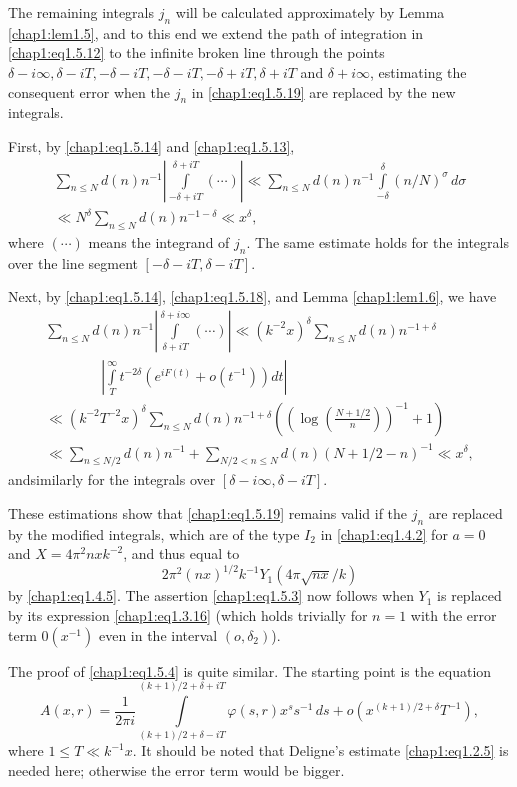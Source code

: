 The remaining integrals $j_n$ will be calculated approximately by
Lem\-ma \ref{chap1:lem1.5}, and to this end we extend the path of
integration in \eqref{chap1:eq1.5.12} to the infinite broken line
through the points $\delta-i\infty, \delta-iT, -\delta-iT, -\delta-iT,
-\delta+iT, \delta+iT$ and $\delta+i\infty$, estimating the consequent
error when the $j_n$ in \eqref{chap1:eq1.5.19} are replaced by the new
integrals. 

First, by \eqref{chap1:eq1.5.14} and \eqref{chap1:eq1.5.13},
\begin{gather*}
\sum\limits_{n\leq N}d(n)n^{-1}\left|\int\limits_{-\delta+iT}
^{\delta+iT}(\cdots)\right|\ll \sum\limits_{n\leq N}d(n)n^{-1}
\int\limits_{-\delta}^\delta(n/N)^\sigma \,d\sigma\\
\ll N^\delta \sum\limits_{n\leq N}d(n)n^{-1-\delta}\ll x^\delta,
\end{gather*}
where $(\cdots)$ means the integrand of $j_n$. The same estimate holds
for the integrals over the line segment $[-\delta-iT, \delta-iT]$. 

Next, by \eqref{chap1:eq1.5.14}, \eqref{chap1:eq1.5.18}, and Lemma
\ref{chap1:lem1.6}, we have 
\begin{gather*}
\sum\limits_{n\leq N}d(n)n^{-1}\left|\int\limits_{\delta+iT}
^{\delta+i\infty}(\cdots)\right|\ll (k^{-2}x)^\delta
\sum\limits_{n\leq N}d(n)n^{-1+\delta}\\
\qquad\qquad\left| \int\limits_T^\infty
t^{-2\delta}\left(e^{iF(t)}+o(t^{-1})\right)dt\right|\\
\ll (k^{-2}T^{-2}x)^\delta \sum\limits_{n\leq N}d(n)n^{-1+\delta}
\left(\left(\log\left(\frac{N+1/2}{n}\right)\right)^{-1}+1\right)\\
\ll \sum\limits_{n\leq N/2}d(n)n^{-1}+\sum\limits_{N/2<n\leq N} d(n)
(N+1/2-n)^{-1}\ll x^\delta,
\end{gather*}
and\pageoriginale similarly for the integrals over
$[\delta-i\infty,\delta-iT]$.

These estimations show that \eqref{chap1:eq1.5.19} remains valid if
the $j_n$ are replaced by the modified integrals, which are of the
type $I_2$ in \eqref{chap1:eq1.4.2} for $a=0$ and $X=4\pi^2nxk^{-2}$,
and thus equal to 
$$
2\pi^2(nx)^{1/2}k^{-1}Y_1(4\pi\sqrt{nx}/k)
$$
by \eqref{chap1:eq1.4.5}. The assertion \eqref{chap1:eq1.5.3} now
follows when $Y_1$ is replaced by its expression \eqref{chap1:eq1.3.16}
(which holds trivially for $n=1$ with the error term $0(x^{-1})$ even
in the interval $(o,\delta_2)$).

The proof of \eqref{chap1:eq1.5.4} is quite similar. The starting
point is the equation
$$
A(x,r)=\frac{1}{2\pi i}\int\limits_{(k+1)/2+\delta-iT}^
{(k+1)/2+\delta+iT}\varphi(s,r)x^ss^{-1}\,ds+o(x^{(k+1)/2+\delta}
T^{-1}),
$$
where $1\leq T\ll k^{-1}x$. It should be noted that Deligne's estimate
\eqref{chap1:eq1.2.5} is needed here; otherwise the error term would
be bigger.

